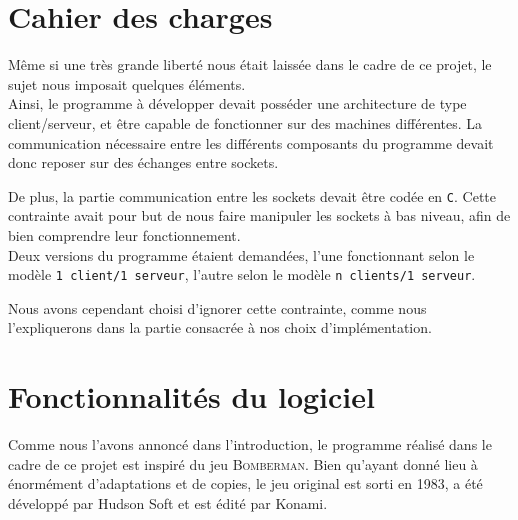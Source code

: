 \section*{Cahier des charges}

Même si une très grande liberté nous était laissée dans le cadre de ce projet, le sujet nous imposait quelques éléments.\\

Ainsi, le programme à développer devait posséder une architecture de type client/serveur, et être capable de fonctionner sur des machines différentes. La communication nécessaire entre les différents composants du programme devait donc reposer sur des échanges entre sockets.

De plus, la partie communication entre les sockets devait être codée en \texttt{C}. Cette contrainte avait pour but de nous faire manipuler les sockets à bas niveau, afin de bien comprendre leur fonctionnement.\\

Deux versions du programme étaient demandées, l'une fonctionnant selon le modèle \texttt{1 client/1 serveur}, l'autre selon le modèle \texttt{n clients/1 serveur}.

Nous avons cependant choisi d'ignorer cette contrainte, comme nous l'expliquerons dans la partie consacrée à nos choix d'implémentation.

\section*{Fonctionnalités du logiciel}

Comme nous l'avons annoncé dans l'introduction, le programme réalisé dans le cadre de ce projet est inspiré du jeu \textsc{Bomberman}. Bien qu'ayant donné lieu à énormément d'adaptations et de copies, le jeu original est sorti en 1983, a été développé par Hudson Soft et est édité par Konami.\\

